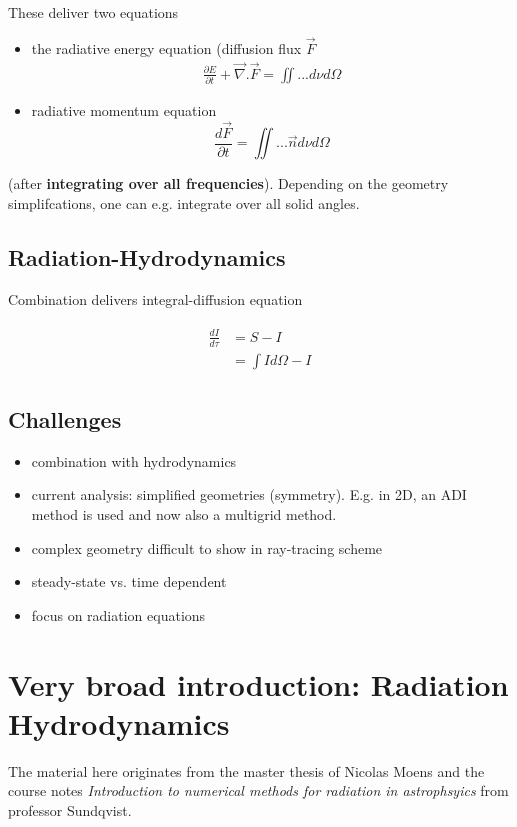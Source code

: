 \documentclass[../main/main.tex]{subfiles}
\begin{document}
These deliver two equations
\begin{itemize}
	\item the radiative energy equation (diffusion flux $\vec{F}$
	\begin{eqnarray}
	\frac{\partial E}{\partial t} + \vec{\nabla} . \vec{F} = \iint ... d\nu d \Omega
	\end{eqnarray}
	\item radiative momentum equation
	\begin{equation}
		\frac{d\vec{F}}{\partial t} = \iint ... \vec{n} d\nu d\Omega
		\end{equation}
\end{itemize}
(after \textbf{integrating over all frequencies}). Depending on the geometry simplifcations, one can e.g. integrate over all solid angles.


\subsection{Radiation-Hydrodynamics}
Combination delivers integral-diffusion equation

\begin{eqnarray}
\begin{aligned}
\frac{dI}{d\tau} &=  S - I \\
	&= \int I d\Omega - I
\end{aligned}
\end{eqnarray}

\subsection{Challenges}
\begin{itemize}
	\item combination with hydrodynamics
	\item current analysis: simplified geometries (symmetry). E.g. in 2D, an ADI method is used and now also a multigrid method. 
	\item complex geometry difficult to show in ray-tracing scheme
	\item steady-state vs. time dependent
	\item focus on radiation equations
\end{itemize}

\newpage
\section{Very broad introduction: Radiation Hydrodynamics}
The material here originates from the master thesis of Nicolas Moens and the course notes \textit{Introduction to numerical methods for radiation in astrophsyics} from professor Sundqvist. 
\end{document}
